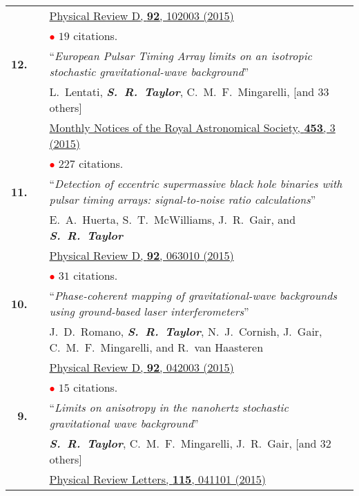 \documentclass[11pt,letterpaper,sans]{moderncv}
\begin{document}
{\begin{longtable}{rp{0.3cm}p{15.8cm}}
&& \href{http://journals.aps.org/prd/abstract/10.1103/PhysRevD.92.102003}{{\color{color1} Physical Review D, \textbf{92}, 102003 (2015)}} \\
&& \textcolor{red}{$\bullet$} $19$ citations. \vspace{0.09cm}\\
\textbf{12.} & & ``\textit{European Pulsar Timing Array limits on an isotropic stochastic gravitational-wave background}'' \\ 
&& L.~Lentati, \textit{\textbf{S.~R.~Taylor}}, C.~M.~F.~Mingarelli, [and 33 others] \\ 
&& \href{http://mnras.oxfordjournals.org/content/453/3/2576}{{\color{color1} Monthly Notices of the Royal Astronomical Society, \textbf{453}, 3 (2015)}} \\
&& \textcolor{red}{$\bullet$} $227$ citations. \vspace{0.09cm}\\
\textbf{11.} & & ``\textit{Detection of eccentric supermassive black hole binaries with pulsar timing arrays: signal-to-noise ratio calculations}'' \\ && E.~A.~Huerta, S.~T.~McWilliams, J.~R.~Gair, and \textit{\textbf{S.~R.~Taylor}} \\ 
&& \href{http://journals.aps.org/prd/abstract/10.1103/PhysRevD.92.063010}{{\color{color1} Physical Review D, \textbf{92}, 063010 (2015)}} \\
&& \textcolor{red}{$\bullet$} $31$ citations. \vspace{0.09cm}\\
\textbf{10.} & & ``\textit{Phase-coherent mapping of gravitational-wave backgrounds using ground-based laser interferometers}'' \\ 
&& J.~D.~Romano, \textit{\textbf{S.~R.~Taylor}}, N.~J.~Cornish, J.~Gair, C.~M.~F.~Mingarelli, and R.~van Haasteren \\ 
&& \href{http://journals.aps.org/prd/abstract/10.1103/PhysRevD.92.042003}{{\color{color1} Physical Review D, \textbf{92}, 042003 (2015)}} \\
&& \textcolor{red}{$\bullet$} $15$ citations. \vspace{0.09cm}\\
\textbf{9.} & & ``\textit{Limits on anisotropy in the nanohertz stochastic gravitational wave background}'' \\ 
&& \textit{\textbf{S.~R.~Taylor}}, C.~M.~F.~Mingarelli, J.~R.~Gair, [and 32 others] \\ 
&& \href{http://journals.aps.org/prl/abstract/10.1103/PhysRevLett.115.041101}{{\color{color1} Physical Review Letters, \textbf{115}, 041101 (2015)}} \\

\end{longtable}}
\end{document}
